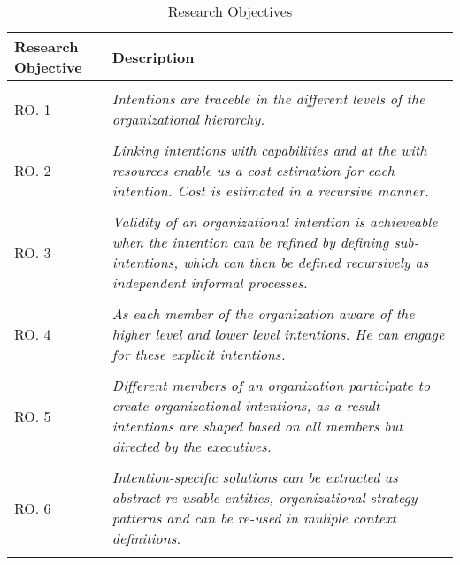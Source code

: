 \begin{center}
	\begin{longtable}{p{5cm}p{11cm}} 
   	\toprule 
	\textbf{Research Objective} & \textbf{Description} \\
	\midrule
	\endfirsthead
	\\
	RO. 1 & \textit{Intentions are traceble in the different levels of the organizational hierarchy. } \label{ro1} \\
	\\[-1.5ex]
	RO. 2 & \textit{Linking intentions with capabilities and at the with resources enable us a cost estimation for each intention. Cost is estimated in a recursive manner.} \label{ro2} \\
	\\[-1.5ex]
	RO. 3 & \textit{Validity of an organizational intention is achieveable when the intention can be refined by defining sub-intentions, which can then be defined recursively as independent informal processes.} \label{ro3}\\
	\\[-1.5ex]
	RO. 4 & \textit{As each member of the organization aware of the higher level and lower level intentions. He can engage for these explicit intentions. } \label{ro4}\\
	\\[-1.5ex]
	RO. 5 & \textit{Different members of an organization participate to create organizational intentions, as a result intentions are shaped based on all members but directed by the executives.} \label{ro5}\\
	\\[-1.5ex]
	RO. 6 & \textit{Intention-specific solutions can be extracted as abstract re-usable entities, organizational strategy patterns and can be re-used in muliple context definitions.} \label{ro6}\\
	
	\bottomrule
	\caption{Research Objectives}
	\label{tab:researchobjectives}
	\end{longtable}	
\end{center}
